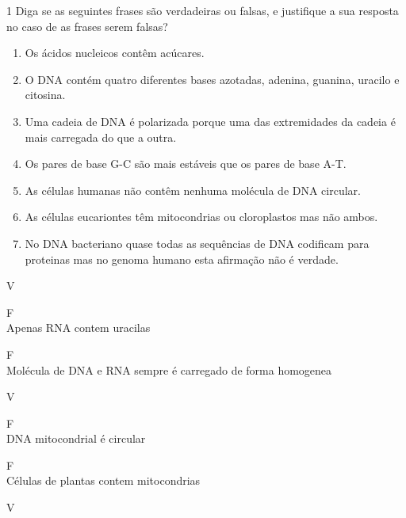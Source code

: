 \documentclass[\mainfilename]{subfiles}
\begin{document}
\begin{questionBox}1{ %
    Diga se as seguintes frases são verdadeiras ou falsas, e justifique a sua resposta no caso de as frases serem falsas?
} %
    \begin{enumerate}
        \item Os ácidos nucleicos contêm acúcares.
        \item O DNA contém quatro diferentes bases azotadas, adenina, guanina, uracilo e citosina.
        \item Uma cadeia de DNA é polarizada porque uma das extremidades da cadeia é mais carregada do que a outra.
        \item Os pares de base G-C são mais estáveis que os pares de base A-T.
        \item As células humanas não contêm nenhuma molécula de DNA circular.
        \item As células eucariontes têm mitocondrias ou cloroplastos mas não ambos.
        \item No DNA bacteriano quase todas as sequências de DNA codificam para proteinas mas no genoma humano esta afirmação não é verdade.        
    \end{enumerate}
    
    \begin{answerBox}{} %
        \begin{enumerate}
            \begin{multicols}{2}
                \item V
                \item F\\Apenas RNA contem uracilas
                \item F\\Molécula de DNA e RNA sempre é carregado de forma homogenea
                \item V
                \item F\\DNA mitocondrial é circular
                \item F\\Células de plantas contem mitocondrias
                \item V
            \end{multicols}
        \end{enumerate}
    \end{answerBox}
\end{questionBox}
\end{document}
